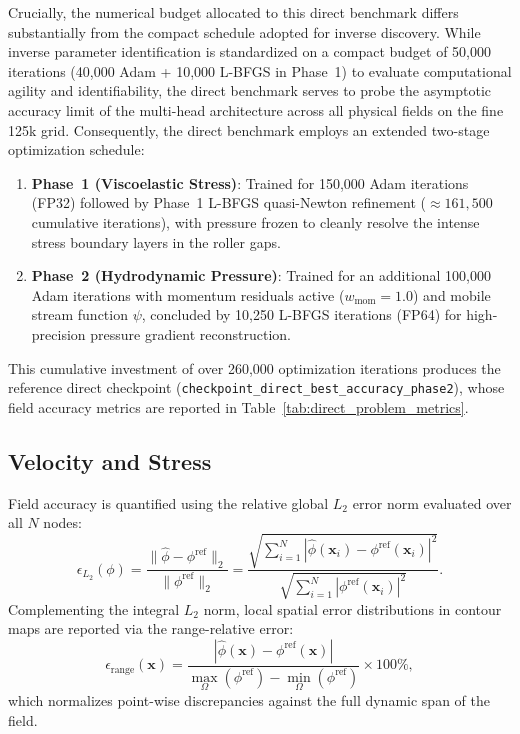 Crucially, the numerical budget allocated to this direct benchmark differs
substantially from the compact schedule adopted for inverse discovery.
While inverse parameter identification is standardized on a compact budget
of 50{,}000 iterations (40{,}000 Adam + 10{,}000 L-BFGS in Phase~1) to evaluate
computational agility and identifiability, the direct benchmark serves to probe the
asymptotic accuracy limit of the multi-head architecture across all physical fields
on the fine 125k grid. Consequently, the direct benchmark employs an extended
two-stage optimization schedule:
\begin{enumerate}
    \item \textbf{Phase~1 (Viscoelastic Stress)}:
        Trained for 150{,}000 Adam iterations (FP32) followed by Phase~1 L-BFGS
        quasi-Newton refinement ($\approx 161{,}500$ cumulative iterations),
        with pressure frozen to cleanly resolve the intense stress boundary layers
        in the roller gaps.
    \item \textbf{Phase~2 (Hydrodynamic Pressure)}:
        Trained for an additional 100{,}000 Adam iterations with momentum residuals
        active ($w_{\mathrm{mom}} = 1.0$) and mobile stream function $\psi$,
        concluded by 10{,}250 L-BFGS iterations (FP64) for high-precision
        pressure gradient reconstruction.
\end{enumerate}
This cumulative investment of over 260{,}000 optimization iterations produces
the reference direct checkpoint (\texttt{checkpoint\_direct\_best\_accuracy\_phase2}),
whose field accuracy metrics are reported in Table~\ref{tab:direct_problem_metrics}.

\subsection{Velocity and Stress}
\label{subsec:kinematic_and_stress_accuracy}

Field accuracy is quantified using the relative global $L_2$ error norm evaluated
over all $N$ nodes:
\begin{equation}
    \epsilon_{L_2}(\phi) = \frac{\|\hat{\phi} - \phi^{\mathrm{ref}}\|_2}{\|\phi^{\mathrm{ref}}\|_2} = \frac{\sqrt{\sum_{i=1}^N |\hat{\phi}(\boldsymbol{x}_i) - \phi^{\mathrm{ref}}(\boldsymbol{x}_i)|^2}}{\sqrt{\sum_{i=1}^N |\phi^{\mathrm{ref}}(\boldsymbol{x}_i)|^2}} .
    \label{eq:error_metrics_definition}
\end{equation}
Complementing the integral $L_2$ norm, local spatial error distributions in contour
maps are reported via the range-relative error:
\begin{equation}
    \epsilon_{\mathrm{range}}(\boldsymbol{x}) = \frac{|\hat{\phi}(\boldsymbol{x}) - \phi^{\mathrm{ref}}(\boldsymbol{x})|}{\max_{\Omega}(\phi^{\mathrm{ref}}) - \min_{\Omega}(\phi^{\mathrm{ref}})} \times 100\% ,
    \label{eq:range_relative_error_definition}
\end{equation}
which normalizes point-wise discrepancies against the full dynamic span of the field.

